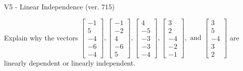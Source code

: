 \begin{exercise}
  \begin{exerciseTitle}V5 - Linear Independence (ver. 715)\end{exerciseTitle}
  \begin{exerciseStatement}
    Explain why the vectors \(\left[\begin{array}{r}
-1 \\
5 \\
-4 \\
-6 \\
-4
\end{array}\right] , \left[\begin{array}{r}
-1 \\
-2 \\
4 \\
-6 \\
5
\end{array}\right] , \left[\begin{array}{r}
4 \\
-5 \\
-3 \\
-3 \\
-4
\end{array}\right] , \left[\begin{array}{r}
3 \\
2 \\
-4 \\
-2 \\
-1
\end{array}\right] , \text{ and } \left[\begin{array}{r}
3 \\
5 \\
-4 \\
3 \\
2
\end{array}\right]\) are linearly dependent or linearly independent.	



\end{exerciseStatement}
\end{exercise}
